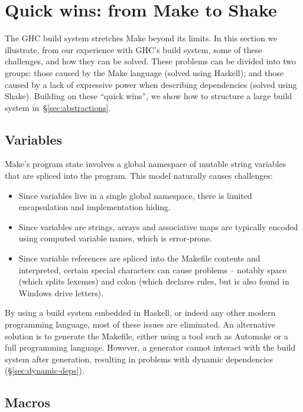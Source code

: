 \section{Quick wins: from Make to Shake\label{sec:solutions}}

The GHC build system stretches Make beyond its limits.
In this section we illustrate, from our experience with GHC's build system,
some of these challenges, and how they can be solved.
These problems can be divided into two groups: those caused by the
Make language (solved using Haskell); and those caused by a lack of expressive
power when describing dependencies (solved using Shake).
Building on these ``quick wins'', we show how to structure a
large build system in~\S\ref{sec:abstractions}.

\subsection{Variables}

Make's program state involves a global namespace of mutable string variables that are
spliced into the program. This model naturally causes challenges:

\begin{itemize}
\item Since variables live in a single global namespace, there is limited
encapsulation and implementation hiding.
\item Since variables are strings, arrays and associative maps are typically
encoded using computed variable names, which is error-prone.
\item Since variable references are spliced into the Makefile contents
and interpreted, certain special characters can cause problems --
notably space (which splits lexemes) and colon (which declares rules, but is
also found in Windows drive letters).
\end{itemize}

\noindent By using a build system embedded in Haskell, or indeed any other
modern programming language, most of these issues are eliminated. An alternative solution is to generate the Makefile, either using a tool such as Automake or a full programming language. However, a generator cannot interact with the
build system after generation, resulting in problems with dynamic dependencies
(\S\ref{sec:dynamic-deps}).

\subsection{Macros\label{sec:pattern-rule-language}}

